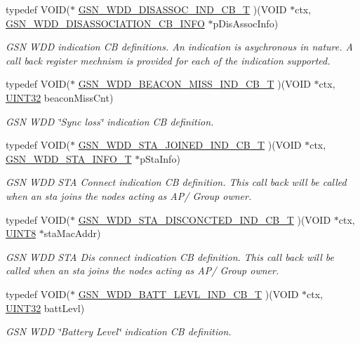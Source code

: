 \begin{DoxyCompactItemize}
\item 
typedef VOID($\ast$ \hyperlink{a00677_gadb536a5e296beff888ffe8f4cdc68507}{GSN\_\-WDD\_\-DISASSOC\_\-IND\_\-CB\_\-T} )(VOID $\ast$ctx, \hyperlink{a00379}{GSN\_\-WDD\_\-DISASSOCIATION\_\-CB\_\-INFO} $\ast$pDisAssocInfo)
\begin{DoxyCompactList}\small\item\em GSN WDD indication CB definitions. An indication is asychronous in nature. A call back register mechnism is provided for each of the indication supported. \end{DoxyCompactList}\item 
typedef VOID($\ast$ \hyperlink{a00677_ga6b4e6d07b52788c8ddf01ddaa89429ad}{GSN\_\-WDD\_\-BEACON\_\-MISS\_\-IND\_\-CB\_\-T} )(VOID $\ast$ctx, \hyperlink{a00660_gae1e6edbbc26d6fbc71a90190d0266018}{UINT32} beaconMissCnt)
\begin{DoxyCompactList}\small\item\em GSN WDD \char`\"{}Sync loss\char`\"{} indication CB definition. \end{DoxyCompactList}\item 
typedef VOID($\ast$ \hyperlink{a00677_ga607917e8bad21deeb1564d9455d46f28}{GSN\_\-WDD\_\-STA\_\-JOINED\_\-IND\_\-CB\_\-T} )(VOID $\ast$ctx, \hyperlink{a00299}{GSN\_\-WDD\_\-STA\_\-INFO\_\-T} $\ast$pStaInfo)
\begin{DoxyCompactList}\small\item\em GSN WDD STA Connect indication CB definition. This call back will be called when an sta joins the nodes acting as AP/ Group owner. \end{DoxyCompactList}\item 
typedef VOID($\ast$ \hyperlink{a00677_ga3a4ef614815eaa2e3085c2d168a1ced5}{GSN\_\-WDD\_\-STA\_\-DISCONCTED\_\-IND\_\-CB\_\-T} )(VOID $\ast$ctx, \hyperlink{a00660_gab27e9918b538ce9d8ca692479b375b6a}{UINT8} $\ast$staMacAddr)
\begin{DoxyCompactList}\small\item\em GSN WDD STA Dis connect indication CB definition. This call back will be called when an sta joins the nodes acting as AP/ Group owner. \end{DoxyCompactList}\item 
typedef VOID($\ast$ \hyperlink{a00677_gae1fd7b71fd69db9cad751f084daf2199}{GSN\_\-WDD\_\-BATT\_\-LEVL\_\-IND\_\-CB\_\-T} )(VOID $\ast$ctx, \hyperlink{a00660_gae1e6edbbc26d6fbc71a90190d0266018}{UINT32} battLevl)
\begin{DoxyCompactList}\small\item\em GSN WDD \char`\"{}Battery Level\char`\"{} indication CB definition. \end{DoxyCompactList}\item 

\end{DoxyCompactItemize}
